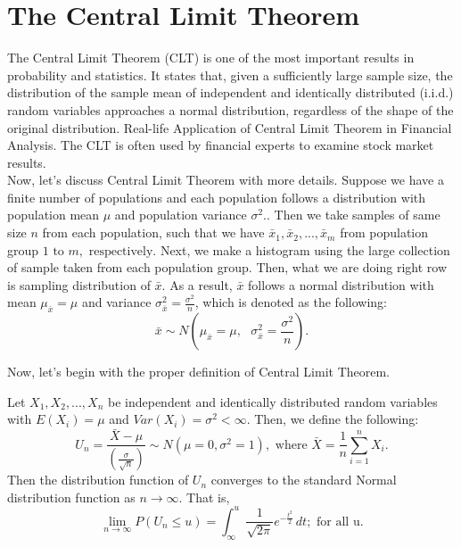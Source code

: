 \chapter{The Central Limit Theorem}

The Central Limit Theorem (CLT) is one of the most important results in probability and statistics. It states that, given a sufficiently large sample size, the distribution of the sample mean of independent and identically distributed (i.i.d.) random variables approaches a normal distribution, regardless of the shape of the original distribution. Real-life Application of Central Limit Theorem in Financial Analysis. The CLT is often used by financial experts to examine stock market results.\\

\noindent
Now, let's discuss Central Limit Theorem with more details. Suppose we have a finite number of populations and each population follows a distribution with population mean $\mu$ and population variance $\sigma^2.$. Then we take samples of same size $n$ from each population, such that we have $\bar{x}_1, \bar{x}_2, ..., \bar{x}_m$ from population group $1 \text{ to } m, \text{ respectively.}$ Next, we make a histogram using the large collection of sample taken from each population group. Then, what we are doing right row is sampling distribution of $\bar{x}$. As a result, $\bar{x}$ follows a normal distribution with mean $\mu_{\bar{x}} = \mu$ and variance $\sigma_{\bar{x}}^{2} = \frac{\sigma^2}{n}$, which is denoted as the following: \[ \bar{x} \sim N(\mu_{\bar{x}} = \mu, \text{ } \sigma_{\bar{x}}^{2} = \frac{\sigma^2}{n}).\]

\noindent
Now, let's begin with the proper definition of Central Limit Theorem.

\begin{definition}
Let $X_1, X_2, ..., X_n$ be independent and identically distributed random variables with $E(X_i) = \mu$ and $Var(X_i) = \sigma^2 < \infty$. Then, we define the following: \[ U_{n} = \frac{\bar{X} - \mu}{(\frac{\sigma}{\sqrt{n}})} \sim N(\mu = 0, \sigma^2 = 1), \text{ where $\bar{X} = \frac{1}{n} \sum_{i =1}^{n}X_i$.}\]
Then the distribution function of $U_{n}$ converges to the standard Normal distribution function as $n \longrightarrow \infty$. That is, \[ \lim_{n\to\infty}P(U_n \le u) = \int_{\infty}^{u} \frac{1}{\sqrt{2\pi}} e^{-\frac{t^2}{2}}\,dt; \text{ for all u.}\]
\end{definition}

